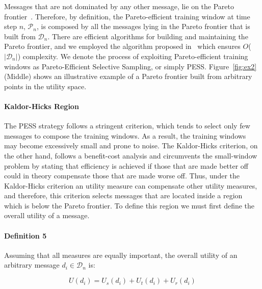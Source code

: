 Messages that are not dominated
by any other message, lie on the Pareto frontier~\cite{palda@book}. Therefore, by definition, the Pareto-efficient training window at time step $n$, $\mathcal{P}_n$, is composed by all the messages lying in the Pareto frontier that is built from $\mathcal{D}_n$.
There are efficient algorithms for building and maintaining the Pareto frontier, and we employed the algorithm proposed in~\cite{operator} which ensures $O$($|\mathcal{D}_n|$) complexity.
We denote the process of exploiting Pareto-efficient training windows as
Pareto-Efficient Selective Sampling, or simply PESS. Figure~\ref{fig:ex2} (Middle) shows an illustrative example of a Pareto frontier built from arbitrary points in the utility space.

\paragraph*{\bf{Kaldor-Hicks Region}}
The PESS strategy follows a stringent criterion, which tends to select only few messages to compose the training windows. As a result, the training windows may become excessively small and prone to noise.
The Kaldor-Hicks criterion, on the other hand,
follows a benefit-cost analysis and circumvents the
small-window problem by stating that efficiency is achieved if
those that are made better off could in theory compensate those that are made worse off. Thus, under the Kaldor-Hicks criterion an utility measure can compensate other utility measures, and therefore, this criterion selects messages that are located inside a region which is below the Pareto frontier. To define this region we must first define the overall utility of a message.

\paragraph*{\bf{Definition 5}} Assuming that all measures are equally important, the overall utility of an arbitrary message $d_i\in\mathcal{D}_n$ is:

\begin{equation}
\label{eq:cost}
U(d_i)=U_s(d_i)+U_t(d_i)+U_r(d_i)
\end{equation}

